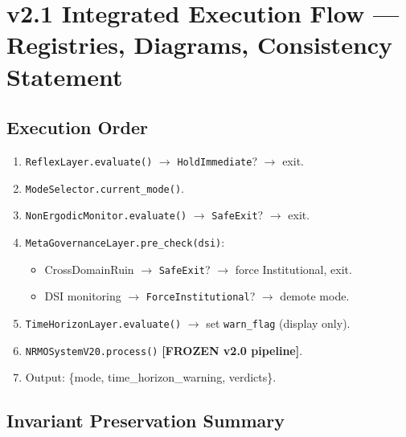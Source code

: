 
\chapter{v2.1 Integrated Execution Flow ---
Registries, Diagrams, Consistency Statement}
\label{ch:v21-integrated-flow}

\section{Execution Order}
\label{sec:v21-execution-order}

\begin{enumerate}
\item \texttt{ReflexLayer.evaluate()} $\to$ \texttt{HoldImmediate}?
$\to$ exit.
\item \texttt{ModeSelector.current\_mode()}.
\item \texttt{NonErgodicMonitor.evaluate()} $\to$
\texttt{SafeExit}? $\to$ exit.
\item \texttt{MetaGovernanceLayer.pre\_check(dsi)}:
\begin{itemize}
\item CrossDomainRuin $\to$ \texttt{SafeExit}? $\to$ force
Institutional, exit.
\item DSI monitoring $\to$ \texttt{ForceInstitutional}? $\to$ demote
mode.
\end{itemize}
\item \texttt{TimeHorizonLayer.evaluate()} $\to$ set
\texttt{warn\_flag} (display only).
\item \texttt{NRMOSystemV20.process()} \textbf{[FROZEN v2.0
pipeline]}.
\item Output: \{mode, time\_horizon\_warning, verdicts\}.
\end{enumerate}

\section{Invariant Preservation Summary}
\label{sec:v21-invariant-preservation}

